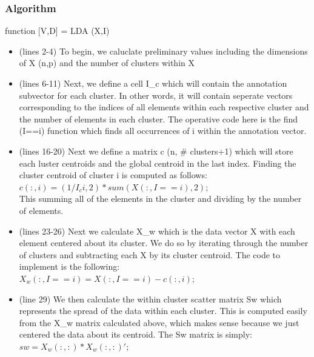 \documentclass{article}
\begin{document}
\subsubsection*{Algorithm}function [V,D] = LDA (X,I)
        \begin{itemize}
            \item(lines 2-4) To begin, we caluclate preliminary values including the dimensions of X (n,p) and the number of clusters within X \\
        
            \item(lines 6-11) Next, we define a cell I\_c which will contain the annotation subvector for each cluster.  In other words, it will contain seperate vectors corresponding to the indices of all elements within each respective cluster and the number of elements in each cluster.  The operative code here is the find (I==i) function which finds all occurrences of i within the annotation vector. 
            
            \item(lines 16-20) Next we define a matrix c (n, \# clusters+1) which will store each luster centroids and the global centroid in the last index.  Finding the cluster centroid of cluster i is computed as follows:
            \\$c(:,i)=(1/I_c{i,2}) * sum(X(:,I==i),2);$\\
            This summing all of the elements in the cluster and dividing by the number of elements.
            
            \item(lines 23-26) Next we calculate X\_w which is the data vector X with each element centered about its cluster.  We do so by iterating through the number of clusters and subtracting each X by its cluster centroid.  The code to implement is the following:
            \\$X_w(:,I==i)=X(:,I==i)-c(:,i);$\\
            
            \item(line 29) We then calculate the within cluster scatter matrix Sw which represents the spread of the data within each cluster.  This is computed easily from the X\_w matrix calculated above, which makes sense because we just centered the data about its centroid. The Sw matrix is simply:
            \\$sw=X_w(:,:)*X_w(:,:)';$\\
            

\end{itemize}
\end{document}
